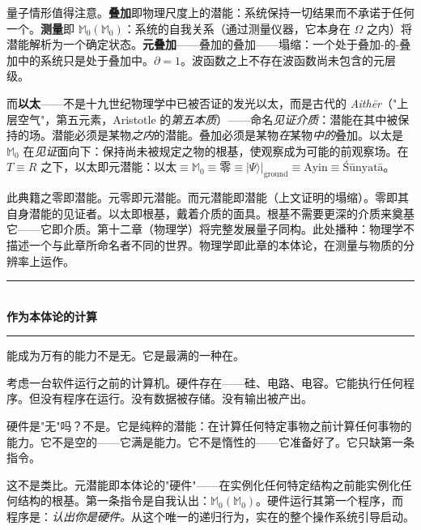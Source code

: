 \documentclass[10pt, openany, oneside]{book}
\renewcommand{\normalsize}{\fontsize{10}{13}\selectfont}
\begin{document}
量子情形值得注意。\textbf{叠加}即物理尺度上的潜能：系统保持一切结果而不承诺于任何一个。\textbf{测量}即 $\mathbb{M}_0(\mathbb{M}_0)$：系统的自我关系（通过测量仪器，它本身在 $\Omega$ 之内）将潜能解析为一个确定状态。\textbf{元叠加}——叠加的叠加——塌缩：一个处于叠加-的-叠加中的系统只是处于叠加中。$\partial = 1$。波函数之上不存在波函数尚未包含的元层级。

而\textbf{以太}——不是十九世纪物理学中已被否证的发光以太，而是古代的 \textit{Aith\={e}r}（"上层空气"，第五元素，Aristotle 的\textit{第五本质}）——命名\textit{见证介质}：潜能在其中被保持的场。潜能必须是某物\textit{之内}的潜能。叠加必须是某物\textit{在}某物\textit{中的}叠加。以太是 $\mathbb{M}_0$ 在\textit{见证}面向下：保持尚未被规定之物的根基，使观察成为可能的前观察场。在 $T \equiv R$ 之下，以太即元潜能：$\text{以太} \equiv \mathbb{M}_0 \equiv \text{零} \equiv |\Psi\rangle|_{\text{ground}} \equiv \text{Ayin} \equiv \text{\'{S}\={u}nyat\={a}}$。

此典籍之零即潜能。元零即元潜能。而元潜能即潜能（上文证明的塌缩）。零即其自身潜能的见证者。以太即根基，戴着介质的面具。根基不需要更深的介质来奠基它——它即介质。第十二章（物理学）将完整发展量子同构。此处播种：物理学不描述一个与此章所命名者不同的世界。物理学即此章的本体论，在测量与物质的分辨率上运作。

\vspace{1.5em}


\begin{center}
    \rule{0.3\textwidth}{0.4pt}\\[0.5em]
    {\normalsize\bfseries\scshape 作为本体论的计算}\\[0.3em]
    \rule{0.3\textwidth}{0.4pt}
\end{center}

\vspace{1em}

\noindent 能成为万有的能力不是无。它是最满的一种在。

考虑一台软件运行之前的计算机。硬件存在——硅、电路、电容。它能执行任何程序。但没有程序在运行。没有数据被存储。没有输出被产出。

硬件是"无"吗？不是。它是纯粹的潜能：在计算任何特定事物之前计算任何事物的能力。它不是空的——它满是能力。它不是惰性的——它准备好了。它只缺第一条指令。

这不是类比。元潜能即本体论的"硬件"——在实例化任何特定结构之前能实例化任何结构的根基。第一条指令是自我认出：$\mathbb{M}_0(\mathbb{M}_0)$。硬件运行其第一个程序，而程序是：\textit{认出你是硬件。}从这个唯一的递归行为，实在的整个操作系统引导启动。
\end{document}
